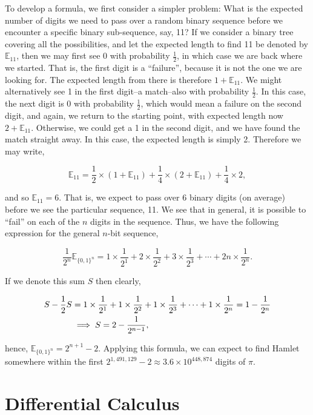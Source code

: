 \documentclass[11pt]{amsart}
\begin{document}
To develop a formula, we first consider a simpler problem: What is the expected number of digits we need to pass over a random binary sequence before we encounter a specific binary sub-sequence, say, 11? If we consider a binary tree covering all the possibilities, and let the expected length to find 11 be denoted by $\mathbb{E}_{11}$, then we may first see 0 with probability $\frac{1}{2}$, in which case we are back where we started. That is, the first digit is a ``failure'', because it is not the one we are looking for. The expected length from there is therefore $1 + \mathbb{E}_{11}$. We might alternatively see 1 in the first digit--a match--also with probability $\frac{1}{2}$. In this case, the next digit is 0 with probability $\frac{1}{2}$, which would mean a failure on the second digit, and again, we return to the starting point, with expected length now $2 + \mathbb{E}_{11}$. Otherwise, we could get a 1 in the second digit, and we have found the match straight away. In this case, the expected length is simply 2. Therefore we may write,

$$\mathbb{E}_{11} = \frac{1}{2}\times(1 + \mathbb{E}_{11}) + \frac{1}{4}\times (2 + \mathbb{E}_{11}) + \frac{1}{4}\times 2,$$

and so $\mathbb{E}_{11} = 6$. That is, we expect to pass over $6$ binary digits (on average) before we see the particular sequence, 11. We see that in general, it is possible to ``fail'' on each of the $n$ digits in the sequence. Thus, we have the following expression for the general $n$-bit sequence,

$$\frac{1}{2^n}\mathbb{E}_{\{0, 1\}^n} = 1\times\frac{1}{2^1} + 2\times\frac{1}{2^2} + 3\times\frac{1}{2^3} + \cdots + 2n\times\frac{1}{2^{n}}.$$

If we denote this sum $S$ then clearly,

\begin{align}
S - \frac{1}{2}S &= 1\times\frac{1}{2^1} + 1\times\frac{1}{2^2} + 1\times\frac{1}{2^3} + \cdots + 1\times\frac{1}{2^{n}} = 1 - \frac{1}{2^{n}} \notag \\
&\implies S = 2 - \frac{1}{2^{n-1}}, \notag
\end{align}

hence, $\mathbb{E}_{\{0, 1\}^n} = 2^{n+1} - 2$. Applying this formula, we can expect to find Hamlet somewhere within the first $2^{1,491,129} - 2 \approx 3.6\times10^{448,874}$ digits of $\pi$.

\section{Differential Calculus}
\end{document}
